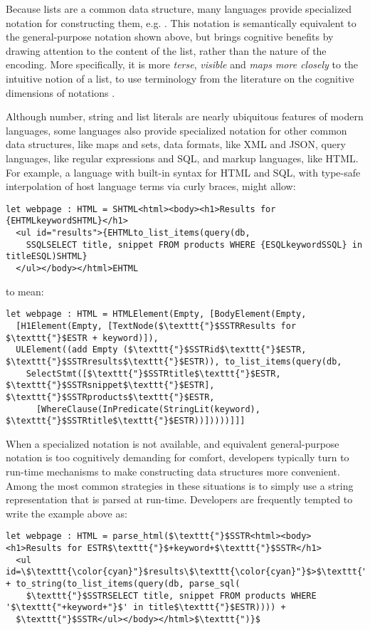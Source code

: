Because lists are a common data structure, many languages provide specialized notation for constructing them, e.g. \li{[1, 2, 3, 4]}. This notation is semantically equivalent to the general-purpose notation shown above, but brings cognitive benefits by drawing attention to the content of the list, rather than the nature of the encoding. More specifically, it is more \emph{terse}, \emph{visible} and \emph{maps more closely} to the intuitive notion of a list, to use terminology from the literature on the cognitive dimensions of notations \cite{green1996usability}.

Although number, string and list literals are nearly ubiquitous features of modern languages, some languages also  provide specialized notation for other common data structures, like maps and sets, data formats, like XML and JSON, query languages, like regular expressions and SQL, and markup languages, like HTML. For example, a language with built-in syntax for HTML and SQL, with type-safe interpolation of host language terms via curly braces, might allow:
\begin{lstlisting}
let webpage : HTML = SHTML<html><body><h1>Results for {EHTMLkeywordSHTML}</h1>
  <ul id="results">{EHTMLto_list_items(query(db, 
    SSQLSELECT title, snippet FROM products WHERE {ESQLkeywordSSQL} in titleESQL)SHTML}
  </ul></body></html>EHTML
\end{lstlisting}
to mean:
\begin{lstlisting}
let webpage : HTML = HTMLElement(Empty, [BodyElement(Empty,
  [H1Element(Empty, [TextNode($\texttt{"}$SSTRResults for $\texttt{"}$ESTR + keyword)]), 
  ULElement((add Empty ($\texttt{"}$SSTRid$\texttt{"}$ESTR, $\texttt{"}$SSTRresults$\texttt{"}$ESTR)), to_list_items(query(db, 
    SelectStmt([$\texttt{"}$SSTRtitle$\texttt{"}$ESTR, $\texttt{"}$SSTRsnippet$\texttt{"}$ESTR], $\texttt{"}$SSTRproducts$\texttt{"}$ESTR, 
      [WhereClause(InPredicate(StringLit(keyword), $\texttt{"}$SSTRtitle$\texttt{"}$ESTR))]))))]]]
\end{lstlisting}

When a specialized notation is not available, and equivalent general-purpose notation is too cognitively demanding for comfort, developers typically turn to run-time mechanisms to make constructing data structures more convenient. Among the most common strategies in these situations is to simply use a string representation that is parsed at run-time. Developers are frequently  tempted to write the example above as:
\begin{lstlisting}
let webpage : HTML = parse_html($\texttt{"}$SSTR<html><body><h1>Results for ESTR$\texttt{"}$+keyword+$\texttt{"}$SSTR</h1>
  <ul id=\$\texttt{\color{cyan}"}$results\$\texttt{\color{cyan}"}$>$\texttt{"}$ESTR + to_string(to_list_items(query(db, parse_sql(
  	$\texttt{"}$SSTRSELECT title, snippet FROM products WHERE '$\texttt{"+keyword+"}$' in title$\texttt{"}$ESTR)))) + 
  $\texttt{"}$SSTR</ul></body></html>$\texttt{")}$
\end{lstlisting}

